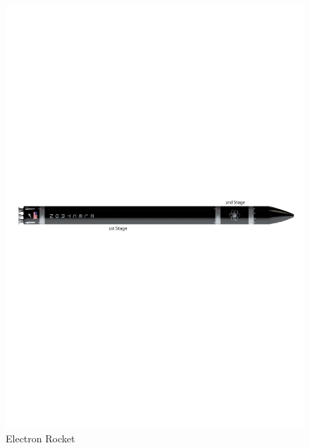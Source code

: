 \begin{figure}[h!]
\centering 
\includegraphics[scale=0.7]{./sections/Constellation_Deployment/S2-Launcher/Images_S2/Picture_1_S2.pdf} 
\caption{Electron Rocket}
\label{fig:rocket}
\end{figure}
\newline\newline

